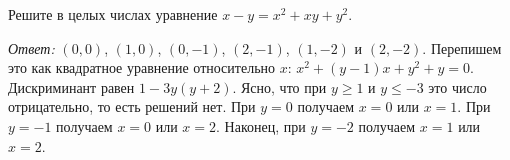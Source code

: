 \problem
Решите в целых числах уравнение $x - y = x^2 + x y + y^2$.

\solution
\emph{Ответ:} $(0, 0)$, $(1, 0)$, $(0, -1)$, $(2, -1)$, $(1, -2)$ и $(2, -2)$.
Перепишем это как квадратное уравнение относительно $x$:
$x^2 + (y - 1) x + y^2 + y = 0$.
Дискриминант равен $1 - 3 y (y + 2)$.
Ясно, что при $y \geq 1$ и $y \leq -3$ это число отрицательно, то есть
решений нет.
При $y = 0$ получаем $x = 0$ или $x = 1$.
При $y = -1$ получаем $x = 0$ или $x = 2$.
Наконец, при $y = -2$ получаем $x = 1$ или $x = 2$.

\endproblem
